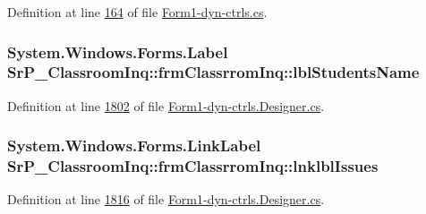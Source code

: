 \-Definition at line \hyperlink{_form1-dyn-ctrls_8cs_source_l00164}{164} of file \hyperlink{_form1-dyn-ctrls_8cs_source}{\-Form1-\/dyn-\/ctrls.\-cs}.

\hypertarget{class_sr_p___classroom_inq_1_1frm_classrrom_inq_ac87221e35b87aece56933aba4e90d11e}{
\subsubsection[{lbl\-Students\-Name}]{\setlength{\rightskip}{0pt plus 5cm}\-System.\-Windows.\-Forms.\-Label {\bf \-Sr\-P\-\_\-\-Classroom\-Inq\-::frm\-Classrrom\-Inq\-::lbl\-Students\-Name}}}
\label{class_sr_p___classroom_inq_1_1frm_classrrom_inq_ac87221e35b87aece56933aba4e90d11e}


\-Definition at line \hyperlink{_form1-dyn-ctrls_8_designer_8cs_source_l01802}{1802} of file \hyperlink{_form1-dyn-ctrls_8_designer_8cs_source}{\-Form1-\/dyn-\/ctrls.\-Designer.\-cs}.

\hypertarget{class_sr_p___classroom_inq_1_1frm_classrrom_inq_a814cf817eced89d772f9cba1053bf81b}{
\subsubsection[{lnklbl\-Issues}]{\setlength{\rightskip}{0pt plus 5cm}\-System.\-Windows.\-Forms.\-Link\-Label {\bf \-Sr\-P\-\_\-\-Classroom\-Inq\-::frm\-Classrrom\-Inq\-::lnklbl\-Issues}}}
\label{class_sr_p___classroom_inq_1_1frm_classrrom_inq_a814cf817eced89d772f9cba1053bf81b}


\-Definition at line \hyperlink{_form1-dyn-ctrls_8_designer_8cs_source_l01816}{1816} of file \hyperlink{_form1-dyn-ctrls_8_designer_8cs_source}{\-Form1-\/dyn-\/ctrls.\-Designer.\-cs}.

